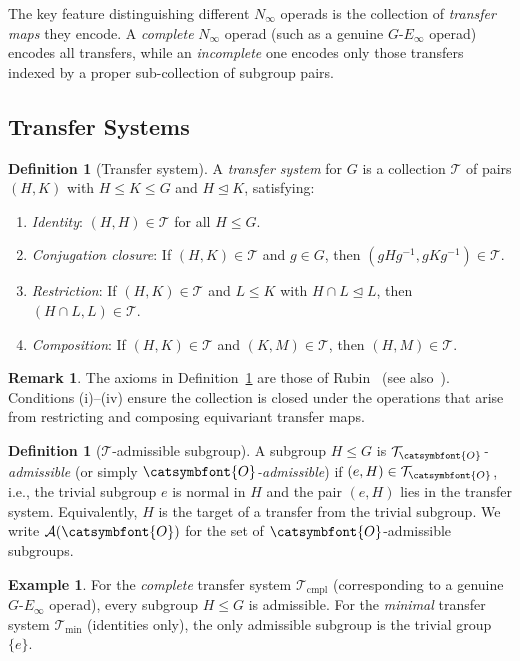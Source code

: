 \documentclass[12pt]{article}
\newcommand{\aO}{{\catsymbfont{O}}}
\newcommand{\aT}{{\mathcal{T}}}
\theoremstyle{definition}
\newtheorem{definition}[theorem]{Definition}
\newtheorem{example}[theorem]{Example}
\newtheorem{remark}[theorem]{Remark}
\begin{document}
The key feature distinguishing different $N_\infty$ operads is the collection of \emph{transfer maps} they encode.  A \emph{complete} $N_\infty$ operad (such as a genuine $G$-$E_\infty$ operad) encodes all transfers, while an \emph{incomplete} one encodes only those transfers indexed by a proper sub-collection of subgroup pairs.

\subsection{Transfer Systems}

\begin{definition}[Transfer system]\label{def:transfer-system}
A \emph{transfer system} for $G$ is a collection $\aT$ of pairs $(H,K)$ with $H \leq K \leq G$ and $H\trianglelefteq K$, satisfying:
\begin{enumerate}[label=(\roman*)]
\item \emph{Identity}: $(H,H)\in\aT$ for all $H\leq G$.
\item \emph{Conjugation closure}: If $(H,K)\in\aT$ and $g\in G$, then $(gHg^{-1}, gKg^{-1})\in\aT$.
\item \emph{Restriction}: If $(H,K)\in\aT$ and $L\leq K$ with $H\cap L \trianglelefteq L$, then $(H\cap L, L)\in\aT$.
\item \emph{Composition}: If $(H,K)\in\aT$ and $(K,M)\in\aT$, then $(H,M)\in\aT$.
\end{enumerate}
\end{definition}

\begin{remark}
The axioms in Definition~\ref{def:transfer-system} are those of Rubin~\cite{Rubin} (see also~\cite[Def.~2.8]{BlumbergHill}).  Conditions (i)--(iv) ensure the collection is closed under the operations that arise from restricting and composing equivariant transfer maps.
\end{remark}

\begin{definition}[$\aT$-admissible subgroup]\label{def:admissible}
A subgroup $H \leq G$ is \emph{$\aT_\aO$-admissible} (or simply \emph{$\aO$-admissible}) if $(e, H)\in\aT_\aO$, i.e., the trivial subgroup $e$ is normal in $H$ and the pair $(e,H)$ lies in the transfer system.  Equivalently, $H$ is the target of a transfer from the trivial subgroup.  We write $\mathcal{A}(\aO)$ for the set of $\aO$-admissible subgroups.
\end{definition}

\begin{example}
For the \emph{complete} transfer system $\aT_{\mathrm{cmpl}}$ (corresponding to a genuine $G$-$E_\infty$ operad), every subgroup $H \leq G$ is admissible.  For the \emph{minimal} transfer system $\aT_{\mathrm{min}}$ (identities only), the only admissible subgroup is the trivial group $\{e\}$.
\end{example}
\end{document}
